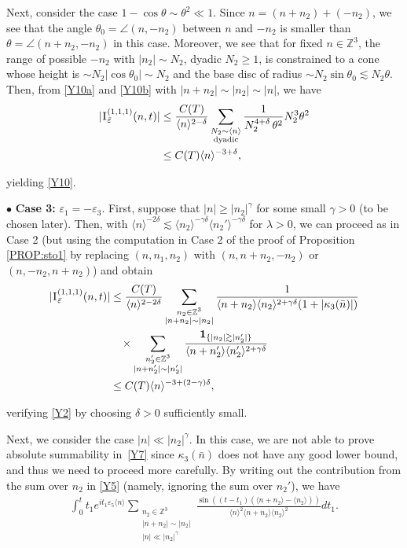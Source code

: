 \documentclass[%
11pt,  reqno]{amsart}
\newcommand{\1}{\hspace{0.2mm}\text{I}\hspace{0.2mm}}
\newcommand{\noi}{\noindent}
\newcommand{\Z}{\mathbb{Z}}
\newcommand{\dl}{\delta}
\newcommand{\eps}{\varepsilon}
\newcommand{\kk}{\kappa}
\newcommand{\g}{\gamma}
\newcommand{\ld}{\lambda}
\newcommand{\ta}{\theta}
\newcommand{\les}{\lesssim}
\newcommand{\ges}{\gtrsim}
\newcommand{\jb}[1]
{\langle #1 \rangle}
\newcommand{\ind}{\mathbf 1}
\numberwithin{equation}{section}
\numberwithin{theorem}{section}
\begin{document}
Next, consider the case  $1 - \cos \ta \sim \ta^2 \ll 1$.
Since $n = (n + n_2) + (- n_2)$, we see that the angle
$\theta_0 = \angle (n, - n_2)$
between $n$ and $- n_2$ is smaller than 
$\ta = \angle(n+n_2, -n_2)$
in this case.
Moreover, 
we see that 
for fixed $n \in \Z^3$, 
 the range of possible $- n_2$ with $|n_2| \sim N_2$, dyadic $N_2\geq 1$, 
is constrained to a cone
whose height is $\sim N_2 |\cos \ta_0| \sim N_2$
and the base disc of radius $\sim N_2 \sin \ta_0 \les N_2 \ta$. 
Then,  from \eqref{Y10a} and \eqref{Y10b}
with $|n + n_2|\sim |n_2|\sim|n|$, 
we have 
\begin{align*}
\begin{split}
|\1^{(1,1,1)}_{\bar \eps} (n,t)|
& \le \frac{C(T)}{\jb{n}^{2-\dl}}
\sum_{\substack{N_2 \sim \jb{n} \\\text{dyadic}} }
\frac{1}{N_2^{4+\dl} \, \ta^{2}} N_2^3 \ta^2 \\
& \le C(T)   
\jb{n}^{-3 +\dl}, 
\end{split}
\end{align*}

\noi
yielding \eqref{Y10}.



\medskip


\noi
$\bullet$ {\bf Case 3:}
 $\eps_1 = - \eps_3$.
\quad  
First, suppose that $|n| \geq |n_2|^{\g}$ for some small $\g>0$
(to be chosen later).
Then, 
with  $\jb{n}^{-2\dl} \les \jb{n_2}^{-\g \dl}\jb{n_2'}^{-\g \dl}$
for $\ld > 0$, 
we can proceed as in Case 2 
(but using the computation in Case 2 of the proof of Proposition \ref{PROP:sto1}
by replacing $(n, n_1, n_2)$ with $(n, n+n_2, -n_2)$ or $(n, -n_2, n+n_2)$)
and obtain
\begin{align*}
|\1^{(1,1,1)}_{\bar \eps} (n,t)|
& \le \frac{C(T)}{\jb{n}^{2-2\dl}}
\sum_{\substack{n_2 \in \Z^3\\|n + n_2| \sim |n_2|}} 
\frac{1}
{ \jb{n+n_2} \jb{n_2}^{2+\g\dl} (1+ |\kk_3(\bar n)|)} \notag \\
& \hphantom{X}
\times
\sum_{\substack{n'_2 \in \Z^3\\|n + n'_2| \sim |n'_2|}}
\frac{\ind_{\{|n_2| \ges |n_2'|\}}}
{ \jb{n+n_2'} \jb{n_2'}^{2+\g\dl}}  \notag \\
& \le C(T) \jb{n}^{-3 + (2-\g)\dl}, 
\end{align*}

\noi
verifying \eqref{Y2} by choosing $\dl > 0$ sufficiently small.

Next, we consider the case 
$|n| \ll |n_2|^{\g}$.
In this case, we are not able to prove absolute summability in~\eqref{Y7} 
since  $\kk_3(\bar n)$ does not have any  good lower bound, 
and thus we need to proceed more carefully.
By writing out the contribution from the sum over $n_2$ in \eqref{Y5}
(namely, ignoring the sum over $n_2'$), we have
\begin{align}
 \int_0^t  t_1  e^{ i t_1 \eps_5\jb{n}}
\sum_{\substack{n_2 \in \Z^3\\|n + n_2| \sim |n_2|\\|n| \ll |n_2|^{\g}}} 
\frac{\sin ((t - t_1) (\jb{n+ n_2} - \jb{n_2}) )}{\jb{n}^2 \jb{n+n_2} \jb{n_2}^2 }
 dt_1.
\label{Y11a}  
\end{align}
\end{document}
